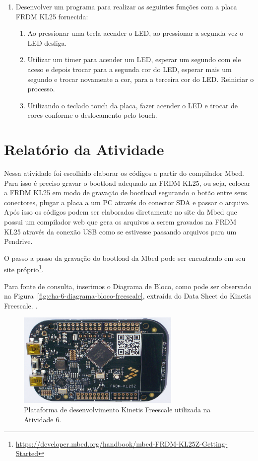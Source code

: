 \documentclass[
	12pt,				%
	openright,			%
  oneside,     %
	a4paper,			%
	english,			%
	french,				%
	spanish,			%
	brazil				%
	]{abntex2}
\begin{document}
\begin{enumerate}
  \item Desenvolver um programa para realizar as seguintes funções com a placa FRDM KL25 fornecida:
  \begin{enumerate}
    \item Ao pressionar uma tecla acender o LED, ao pressionar a segunda vez o LED desliga.
    \item Utilizar um timer para acender um LED, esperar um segundo com ele aceso e depois trocar para a segunda cor do LED, esperar mais um segundo e trocar novamente a cor, para a terceira cor do LED. Reiniciar o processo.
    \item Utilizando o teclado touch da placa, fazer acender o LED e trocar de cores conforme o deslocamento pelo touch.
  \end{enumerate}
\end{enumerate}


\section{Relatório da Atividade} %
\label{sec:kinetis_freescale-consideracoes}

Nessa atividade foi escolhido elaborar os códigos a partir do compilador Mbed. Para isso é preciso gravar o bootload adequado na FRDM KL25, ou seja, colocar a FRDM KL25 em modo de gravação de bootload segurando o botão entre seus conectores, plugar a placa a um PC através do conector SDA e passar o arquivo. Após isso os códigos podem ser elaborados diretamente no site da Mbed que possui um compilador web que gera os arquivos a serem gravados na FRDM KL25 através da conexão USB como se estivesse passando arquivos para um Pendrive.

O passo a passo da gravação do bootload da Mbed pode ser encontrado em seu site próprio\footnote{\url{https://developer.mbed.org/handbook/mbed-FRDM-KL25Z-Getting-Started}}.

Para fonte de consulta, inserimos o Diagrama de Bloco, como pode ser observado na Figura~\ref{fig:cha-6-diagrama-bloco-freescale}, extraída do Data Sheet do Kinetis Freescale. \cite{FreescaleSemiconductor2013}.

\begin{figure}[ht]
  \centering
  \caption{\label{fig:kinetis_freescale}Plataforma de desenvolvimento Kinetis Freescale utilizada na Atividade 6.}
  \includegraphics[width=0.7\textwidth]{images/Atividade06/Freescale_FRDM-KL25Z_board_with_KL25Z128VLK_(ARM_Cortex-M0+_MCU).jpg}
\end{figure}
\end{document}
